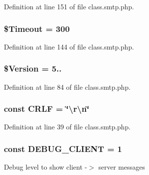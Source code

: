 Definition at line 151 of file class.\+smtp.\+php.

\subsubsection[{\texorpdfstring{\$\+Timeout}{$Timeout}}]{\setlength{\rightskip}{0pt plus 5cm}\$Timeout = 300}\hypertarget{class_s_m_t_p_acaf3ec06f89f4024c5dbeb1a9ecf321c}{}\label{class_s_m_t_p_acaf3ec06f89f4024c5dbeb1a9ecf321c}


Definition at line 144 of file class.\+smtp.\+php.

\subsubsection[{\texorpdfstring{\$\+Version}{$Version}}]{\setlength{\rightskip}{0pt plus 5cm}\$Version = \textquotesingle{}5..\textquotesingle{}}\hypertarget{class_s_m_t_p_a8a43e1c8b245951155d04b279276af95}{}\label{class_s_m_t_p_a8a43e1c8b245951155d04b279276af95}


Definition at line 84 of file class.\+smtp.\+php.

\subsubsection[{\texorpdfstring{C\+R\+LF}{CRLF}}]{\setlength{\rightskip}{0pt plus 5cm}const C\+R\+LF = \char`\"{}\textbackslash{}r\textbackslash{}n\char`\"{}}\hypertarget{class_s_m_t_p_aa8bdd4d85e1ba0db8c09f92688c27ca6}{}\label{class_s_m_t_p_aa8bdd4d85e1ba0db8c09f92688c27ca6}


Definition at line 39 of file class.\+smtp.\+php.

\subsubsection[{\texorpdfstring{D\+E\+B\+U\+G\+\_\+\+C\+L\+I\+E\+NT}{DEBUG_CLIENT}}]{\setlength{\rightskip}{0pt plus 5cm}const D\+E\+B\+U\+G\+\_\+\+C\+L\+I\+E\+NT = 1}\hypertarget{class_s_m_t_p_ae7eea3acb25b5a4367764bcd2f6da5ea}{}\label{class_s_m_t_p_ae7eea3acb25b5a4367764bcd2f6da5ea}
Debug level to show client -\/$>$ server messages 

